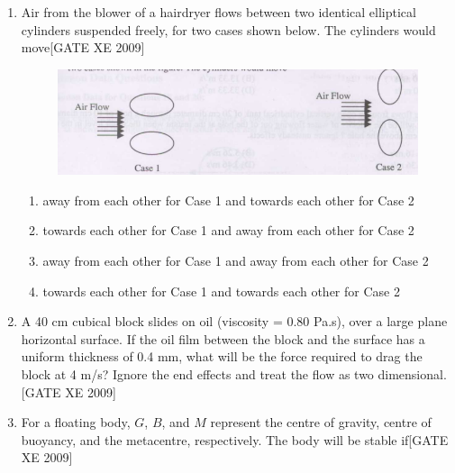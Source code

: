 \documentclass[journal,12pt,onecolumn]{IEEEtran}
\theoremstyle{remark}
\begin{document}
\begin{enumerate}
\item Air from the blower of a hairdryer flows between two identical elliptical cylinders suspended freely, for two cases shown below. The cylinders would move\hfill[GATE XE 2009]
\begin{figure}[H]
    \centering
    \includegraphics[width=0.5\linewidth]{figs/fig1.png}
    \caption*{}
    \label{fig:Q 20}
\end{figure}
\begin{enumerate}
 
    \item away from each other for Case 1 and towards each other for Case 2
    \item towards each other for Case 1 and away from each other for Case 2
    \item away from each other for Case 1 and away from each other for Case 2
    \item towards each other for Case 1 and towards each other for Case 2
\end{enumerate}    




\item A 40 cm cubical block slides on oil (viscosity = 0.80 Pa.s), over a large plane horizontal surface. If the oil film between the block and the surface has a uniform thickness of 0.4 mm, what will be the force required to drag the block at 4 m/s? Ignore the end effects and treat the flow as two dimensional.\hfill[GATE XE 2009]
\begin{enumerate}
\end{enumerate}



\item For a floating body, $G$, $B$, and $M$ represent the centre of gravity, centre of buoyancy, and the metacentre, respectively. The body will be stable if\hfill[GATE XE 2009]

\begin{enumerate}
\end{enumerate}




\end{enumerate}
\end{document}
